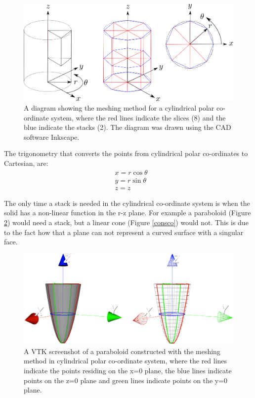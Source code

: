 \documentclass[12pt,a4paper]{article}
\begin{document}
\begin{figure}[h!]
\centering
\includegraphics[scale=0.45]{Images//Coords//cyl.png}
\caption[width=\columnwidth]{A diagram showing the meshing method for a cylindrical polar co-ordinate system, where the red lines indicate the slices (8) and the blue indicate the stacks (2). The diagram was drawn using the CAD software Inkscape.}
\label{cylmeshin}
\end{figure}
The trigonometry that converts the points from cylindrical polar co-ordinates to Cartesian, are:
\begin{equation}
\begin{aligned}
\label{cyctrig}
& x = r \cos{\theta} \\
& y = r \sin{\theta} \\
& z = z
\end{aligned}
\end{equation}

\noindent The only time a stack is needed in the cylindrical co-ordinate system is when the solid has a non-linear function in the r-z plane. For example a paraboloid (Figure \ref{paraco}) would need a stack, but a linear cone (Figure \ref{consco}) would not. This is due to the fact how that a plane can not represent a curved surface with a singular face. 

\begin{figure}[h!]
\centering
\includegraphics[scale=0.3]{Images//Coords//para.png}
\caption[width=\columnwidth]{A VTK screenshot of a paraboloid constructed with the meshing method in cylindrical polar co-ordinate system, where the red lines indicate the points residing on the x=0 plane, the blue lines indicate points on the z=0 plane and green lines indicate points on the y=0 plane.}
\label{paraco}
\end{figure}
\end{document}
